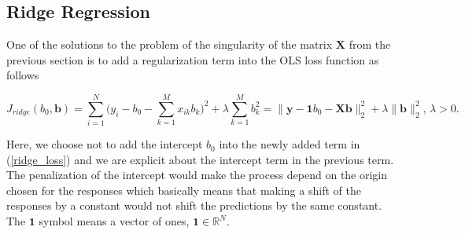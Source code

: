 \documentclass[11pt,oneside,czech,american]{book} %
\theoremstyle{plain}
\theoremstyle{definition}
\begin{document}

\subsection{Ridge Regression} \label{RR}
One of the solutions to the problem of the singularity of the matrix $\bm{X}$ from the previous section is to add a regularization term into the OLS loss function as follows

\begin{equation}
	J_{ridge}(b_0, \bm{b}) = \sum_{i=1}^{N} \Big(y_i - b_0 - \sum_{k=1}^{M} x_{ik} b_k \Big)^2 + \lambda \sum_{k=1}^{M} b_k^2 = \lVert \bm{y} - \bm{1} b_0 -\bm{X}\bm{b}\rVert_{2}^2 + \lambda \lVert \bm{b} \rVert^2_{2} ,\, \lambda>0.
	\label{ridge_loss}
\end{equation}

Here, we choose not to add the intercept $b_0$ into the newly added term in (\ref{ridge_loss}) and we are explicit about the intercept term in the previous term. The penalization of the intercept would make the process depend on the origin chosen for the responses which basically means that making a shift of the responses by a constant would not shift the predictions by the same constant. The $\bm{1}$ symbol means a vector of ones, $\bm{1} \in \mathbb{R}^N$.
\end{document}
